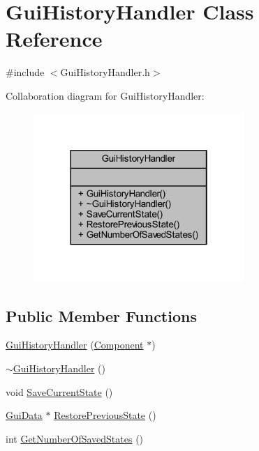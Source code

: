 \hypertarget{class_gui_history_handler}{}\section{Gui\+History\+Handler Class Reference}
\label{class_gui_history_handler}


{\ttfamily \#include $<$Gui\+History\+Handler.\+h$>$}



Collaboration diagram for Gui\+History\+Handler\+:
\nopagebreak
\begin{figure}[H]
\begin{center}
\leavevmode
\includegraphics[width=226pt]{class_gui_history_handler__coll__graph}
\end{center}
\end{figure}
\subsection*{Public Member Functions}
\begin{DoxyCompactItemize}
\item 
\mbox{\hyperlink{class_gui_history_handler_a031398165ee20d6c19700b46698fbe83}{Gui\+History\+Handler}} (\mbox{\hyperlink{class_component}{Component}} $\ast$)
\item 
\mbox{\hyperlink{class_gui_history_handler_a6df6b81fd286088f98ea50acb164b8ba}{$\sim$\+Gui\+History\+Handler}} ()
\item 
void \mbox{\hyperlink{class_gui_history_handler_a238126468501d7d4add2402895569517}{Save\+Current\+State}} ()
\item 
\mbox{\hyperlink{class_gui_data}{Gui\+Data}} $\ast$ \mbox{\hyperlink{class_gui_history_handler_a7c5468c285bc60e8d16701155803be44}{Restore\+Previous\+State}} ()
\item 
int \mbox{\hyperlink{class_gui_history_handler_ac3a45c973e507a52c726ed9a97b1608c}{Get\+Number\+Of\+Saved\+States}} ()
\end{DoxyCompactItemize}


